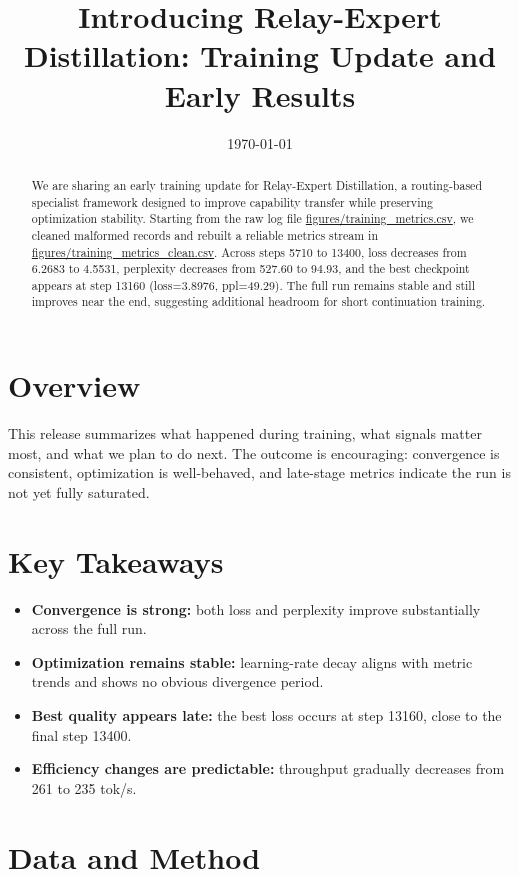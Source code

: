 \documentclass[12pt,a4paper]{article}
\title{Introducing Relay-Expert Distillation: Training Update and Early Results}
\author{}
\date{\today}
\begin{document}
\maketitle

\begin{abstract}
We are sharing an early training update for Relay-Expert Distillation, a routing-based specialist framework designed to improve capability transfer while preserving optimization stability. Starting from the raw log file \url{figures/training_metrics.csv}, we cleaned malformed records and rebuilt a reliable metrics stream in \url{figures/training_metrics_clean.csv}. Across steps 5710 to 13400, loss decreases from 6.2683 to 4.5531, perplexity decreases from 527.60 to 94.93, and the best checkpoint appears at step 13160 (loss=3.8976, ppl=49.29). The full run remains stable and still improves near the end, suggesting additional headroom for short continuation training.
\end{abstract}

\section{Overview}
This release summarizes what happened during training, what signals matter most, and what we plan to do next. The outcome is encouraging: convergence is consistent, optimization is well-behaved, and late-stage metrics indicate the run is not yet fully saturated.

\section{Key Takeaways}
\begin{itemize}
  \item \textbf{Convergence is strong:} both loss and perplexity improve substantially across the full run.
  \item \textbf{Optimization remains stable:} learning-rate decay aligns with metric trends and shows no obvious divergence period.
  \item \textbf{Best quality appears late:} the best loss occurs at step 13160, close to the final step 13400.
  \item \textbf{Efficiency changes are predictable:} throughput gradually decreases from 261 to 235 tok/s.
\end{itemize}

\section{Data and Method}
\end{document}
